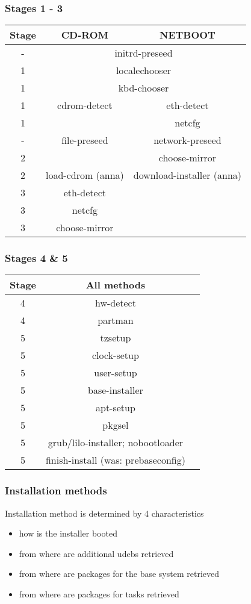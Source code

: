 \documentclass{beamer}
\begin{document}
\begin{frame}
  \frametitle{Stages 1 - 3}
  \begin{small}
    \begin{tabular}{|c|c|c|}
\hline
\textbf{Stage} & \textbf{CD-ROM} & \textbf{NETBOOT} \\
\hline
-  & \multicolumn{2}{c|}{initrd-preseed} \\
\hline
1  & \multicolumn{2}{c|}{localechooser} \\
\hline
1 & \multicolumn{2}{c|}{kbd-chooser} \\
\hline
1 & cdrom-detect & eth-detect \\
\hline
1 & & netcfg \\
\hline
- & file-preseed & network-preseed \\
\hline
2 & & choose-mirror \\
\hline
2 & load-cdrom (anna) & download-installer (anna) \\
\hline
3 & eth-detect & \\
\hline
3 & netcfg & \\
\hline
3 & choose-mirror & \\
\hline
    \end{tabular}
  \end{small}
\end{frame}

\begin{frame}
  \frametitle{Stages 4 \& 5}
  \begin{small}
    \begin{tabular}{|c|c|c|}
\hline
\textbf{Stage} & \textbf{All methods} \\
\hline
4 & hw-detect \\
\hline
4 & partman \\
\hline
5 & tzsetup \\
\hline
5 & clock-setup \\
\hline
5 & user-setup \\
\hline
5 & base-installer \\
\hline
5 & apt-setup \\
\hline
5 & pkgsel \\
\hline
5 & grub/lilo-installer; nobootloader \\
\hline
5 & finish-install (was: prebaseconfig) \\
\hline
  \end{tabular} 
    \end{small}
\end{frame}

\begin{frame}
  \frametitle{Installation methods}
	Installation method is determined by 4 characteristics
	\begin{itemize}
	\item
		how is the installer booted
	\item
		from where are additional udebs retrieved
	\item
		from where are packages for the base system retrieved
	\item
		from where are packages for tasks retrieved
	\end{itemize}
\end{frame}
\end{document}
